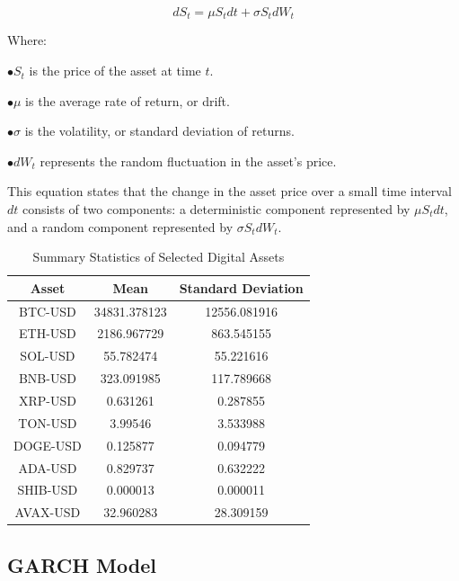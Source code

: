 \documentclass{ledger}
\begin{document}
\[
dS_t = \mu S_t dt + \sigma S_t dW_t
\]

Where:

$ \bullet S_t $ is the price of the asset at time $ t $.
 
$ \bullet \mu $ is the average rate of return, or drift.

$ \bullet \sigma $ is the volatility, or standard deviation of returns.

$ \bullet dW_t $ represents the random fluctuation in the asset's price.

\hfill \break

This equation states that the change in the asset price over a small time interval \( dt \) consists of two components: a deterministic component represented by \( \mu S_t dt \), and a random component represented by \( \sigma S_t dW_t \).



\begin{table}[h]
    \centering
    \begin{tabular}{ccc}
         \toprule
         \textbf{Asset} & \textbf{Mean} & \textbf{Standard Deviation} \\
         \midrule
         BTC-USD & 34831.378123 & 12556.081916 \\
         ETH-USD & 2186.967729 & 863.545155 \\
         SOL-USD & 55.782474 & 55.221616 \\
         BNB-USD & 323.091985 & 117.789668 \\
         XRP-USD & 0.631261 & 0.287855 \\
         TON-USD & 3.99546 & 3.533988 \\
         DOGE-USD & 0.125877 & 0.094779 \\
         ADA-USD & 0.829737 & 0.632222 \\
         SHIB-USD & 0.000013 & 0.000011 \\
         AVAX-USD & 32.960283 & 28.309159 \\
         \bottomrule
    \end{tabular}
    \caption{Summary Statistics of Selected Digital Assets}
    \label{tab:summary_stats}
\end{table}

\subsection{GARCH Model}

\hfill \break
\end{document}
